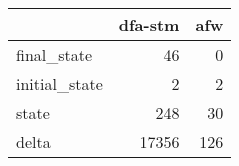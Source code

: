\begin{tabular}{lrr}
\toprule
{} &  dfa-stm &  afw \\
\midrule
final\_state   &       46 &    0 \\
initial\_state &        2 &    2 \\
state         &      248 &   30 \\
delta         &    17356 &  126 \\
\bottomrule
\end{tabular}
